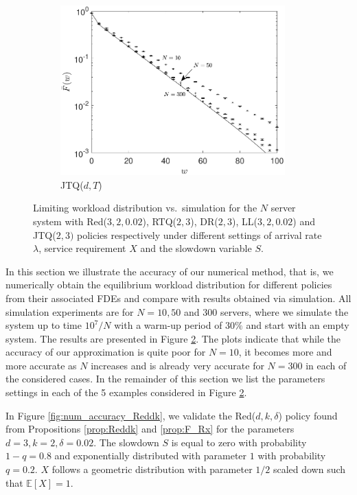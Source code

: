 \documentclass[12pt]{report}
\newcommand{\E}{\mathbb{E}}
\begin{document}
\begin{figure}[t]
\begin{subfigure}{.49\textwidth}
\includegraphics[width=0.95\textwidth]{figures/Chapter4/WL_simul_JTQ.pdf}
\caption{JTQ($d,T$)}
\label{fig:num_accuracy_JTQ}
\end{subfigure}
\caption{Limiting workload distribution vs.~simulation for the $N$
 server system with Red($3,2,0.02$), RTQ($2,3$), DR($2,3$), LL($3,2,0.02$) and JTQ($2,3)$ policies respectively under different settings of arrival rate $\lambda$, service requirement $X$ and  the slowdown variable $S$.}
\label{fig:num_accuracy}
\end{figure}


In this section we illustrate the accuracy of our numerical method, that is, we numerically obtain the equilibrium workload distribution for different policies from their associated FDEs and compare with results obtained via simulation. All simulation experiments are for $N=10,50$ and $300$ servers, where we
simulate the system up to time $10^7/N$ with a warm-up period of $30\%$ and start with an empty system. The results are presented in Figure \ref{fig:num_accuracy}. The plots indicate that while the accuracy of our approximation is quite poor for $N=10$, it becomes more and more accurate as $N$ increases and is already very accurate for $N = 300$ in each of the considered cases. In the remainder of this section we list the parameters settings in each of the 5 examples considered in Figure \ref{fig:num_accuracy}.

In Figure \ref{fig:num_accuracy_Reddk}, we validate the Red($d,k,\delta$) policy found from Propositions \ref{prop:Reddk} and \ref{prop:F_Rx} for the parameters $d=3, k=2, \delta = 0.02$. The slowdown $S$ is equal to zero with probability $1-q=0.8$ and exponentially distributed with parameter $1$ with probability $q=0.2$. $X$ follows a geometric distribution with parameter $1/2$ scaled down such that $\E[X]=1$.
\end{document}
